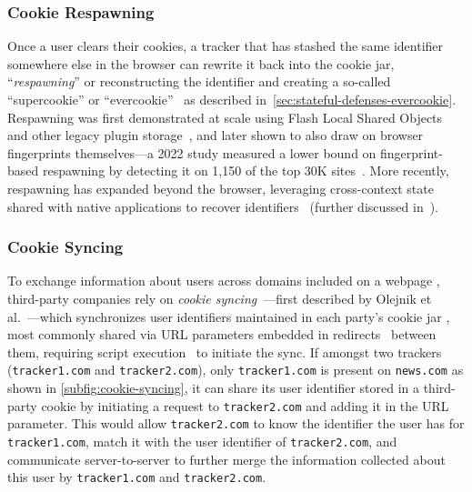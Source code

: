 \subsubsection{Cookie Respawning}
\label{sec:stateful-techniques-cookie-respawning}
Once a user clears their cookies, a tracker that has stashed the same identifier somewhere else in the browser can rewrite it back into the cookie jar, ``\textit{respawning}'' or reconstructing the identifier and creating a so-called ``supercookie'' or ``evercookie''~\cite{ayensonFlashCookiesPrivacy2011,soltaniFlashCookiesPrivacy2009,acarWebNeverForgets2014} as described in~\autoref{sec:stateful-defenses-evercookie}.
%
Respawning was first demonstrated at scale using Flash Local Shared Objects and other legacy plugin storage~\cite{acarWebNeverForgets2014,englehardtOnlineTracking1millionsite2016}, and later shown to also draw on browser fingerprints themselves---a 2022 study measured a lower bound on fingerprint-based respawning by detecting it on 1,150 of the top 30K sites~\cite{fouadMyCookiePhoenix2022}.
%
More recently, respawning has expanded beyond the browser, leveraging cross-context state shared with native applications to recover identifiers~\cite{wessels2025hytrack} (further discussed in~).


\subsubsection{Cookie Syncing}
\label{sec:stateful-techniques-cookie-syncing}%
To exchange information about users across domains included on a webpage \symInclusion, third-party companies rely on \textit{cookie syncing}~\cite{acarWebNeverForgets2014}---first described by Olejnik et al.~\cite{olejnikSellingPrivacyAuction2014}---which synchronizes user identifiers maintained in each party's cookie jar \symStorage, most commonly shared via URL parameters embedded in redirects \symSharing\ between them, requiring script execution \symExecution\ to initiate the sync.
If amongst two trackers (\texttt{tracker1.com} and \texttt{tracker2.com}), only \texttt{tracker1.com} is present on \texttt{news.com} as shown in \autoref{subfig:cookie-syncing}, it can share its user identifier stored in a third-party cookie by initiating a request to \texttt{tracker2.com} and adding it in the URL parameter. 
%
This would allow \texttt{tracker2.com} to know the identifier the user has for \texttt{tracker1.com}, match it with the user identifier of \texttt{tracker2.com}, and communicate server-to-server to further merge the information collected about this user by \texttt{tracker1.com} and \texttt{tracker2.com}. 

